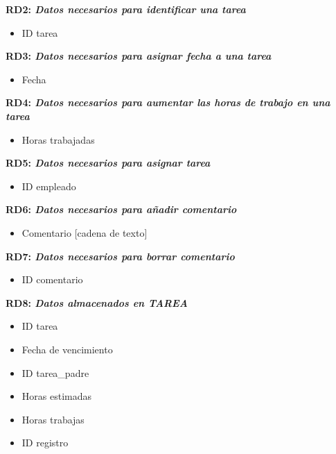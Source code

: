\documentclass[paper=a4, fontsize=11pt, spanish]{scrartcl}
\begin{document}
\setlength{\parindent}{0em}
\textbf{RD2: \textit{Datos necesarios para identificar una tarea}}
\setlength{\parindent}{2em}
\begin{itemize}
\item ID tarea
\end{itemize}

\setlength{\parindent}{0em}
\textbf{RD3: \textit{Datos necesarios para asignar fecha a una tarea}}
\setlength{\parindent}{2em}
\begin{itemize}
\item Fecha
\end{itemize}

\setlength{\parindent}{0em}
\textbf{RD4: \textit{Datos necesarios para aumentar las horas de trabajo en una tarea}}
\setlength{\parindent}{2em}
\begin{itemize}
\item Horas trabajadas
\end{itemize}

\setlength{\parindent}{0em}
\textbf{RD5: \textit{Datos necesarios para asignar tarea}}
\setlength{\parindent}{2em}
\begin{itemize}
\item ID empleado
\end{itemize}

\setlength{\parindent}{0em}
\textbf{RD6: \textit{Datos necesarios para añadir comentario}}
\setlength{\parindent}{2em}
\begin{itemize}
\item Comentario [cadena de texto]
\end{itemize}

\setlength{\parindent}{0em}
\textbf{RD7: \textit{Datos necesarios para borrar comentario}}
\setlength{\parindent}{2em}
\begin{itemize}
\item ID comentario
\end{itemize}

\setlength{\parindent}{0em}
\textbf{RD8: \textit{Datos almacenados en TAREA}}
\setlength{\parindent}{2em}
\begin{itemize}
\item ID tarea
\item Fecha de vencimiento
\item ID tarea\_padre
\item Horas estimadas 
\item Horas trabajas 
\item ID registro
\end{itemize}
\end{document}
